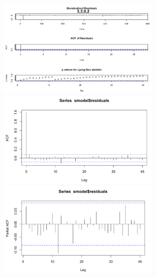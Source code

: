 \documentclass[a4paper,11pt]{article}
\begin{document}
    \newpage
    \begin{figure}[H]
        \centering
        \includegraphics[width=0.7\textwidth]{ha-1_files/figure-markdown_strict/3-3-0-2.png}
        \includegraphics[width=0.7\textwidth]{ha-1_files/figure-markdown_strict/3-3-0-2.1.png}
        \includegraphics[width=0.7\textwidth]{ha-1_files/figure-markdown_strict/3-3-0-2.2.png}
        \label{fig:f9}
    \end{figure}
\end{document}
